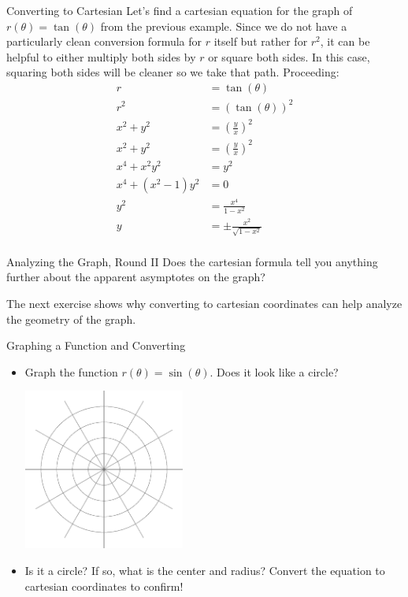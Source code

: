 \begin{example}{Converting to Cartesian} Let's find a cartesian equation for the graph of $r(\theta)=\tan(\theta) $ from the previous example.  Since we do not have a particularly clean conversion formula for $r$ itself but rather for $r^2$, it can be helpful to either multiply both sides by $r$ or square both sides.  In this case, squaring both sides will be cleaner so we take that path.  Proceeding:
\begin{align*}
r&=\tan(\theta) \\
r^2&=\left(\tan(\theta)\right)^2 \\
x^2+y^2&=\left(\frac{y}{x}\right)^2 \\
x^2+y^2&=\left(\frac{y}{x}\right)^2  \\
x^4+x^2y^2&=y^2  \\
x^4+\left(x^2-1\right)y^2&=0  \\
y^2&=\frac{x^4}{1-x^2}  \\
y&=\pm \frac{x^2}{\sqrt{1-x^2}} \\
\end{align*}
\end{example}

\begin{exercise}{Analyzing the Graph, Round II \Coffeecup \Coffeecup}
Does the cartesian formula tell you anything further about the apparent asymptotes on the graph?
\vspace*{.5in}
\end{exercise}
The next exercise shows why converting  to cartesian coordinates can help analyze the geometry of the graph.
\begin{exercise}{Graphing a Function and Converting \Coffeecup \Coffeecup \Coffeecup}
\begin{itemize}
\item Graph the function $r(\theta)=\sin(\theta)$.  Does it look like a circle?
	\begin{center}
	\includegraphics[width=150pt]{polar.eps}
    \end{center}

\item Is it a circle?  If so, what is the center and radius?  Convert the equation to cartesian coordinates to confirm!   
\vspace*{1in}
\end{itemize}
\end{exercise}

